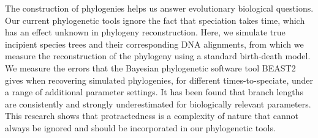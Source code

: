 The construction of phylogenies helps us answer evolutionary biological
questions.
Our current phylogenetic tools ignore the fact that speciation takes time,
which has an effect unknown in phylogeny reconstruction.
Here, we simulate true incipient species trees and their corresponding
DNA alignments, from which we measure the reconstruction of the phylogeny
using a standard birth-death model.
We measure the errors that the Bayesian phylogenetic software tool BEAST2
gives when recovering simulated phylogenies, for different times-to-speciate,
under a range of additional parameter settings.
It has been found that branch lengths are consistently and strongly 
underestimated for biologically relevant parameters.
This research shows that protractedness is a complexity of nature that
cannot always be ignored and should be incorporated in our phylogenetic
tools.
